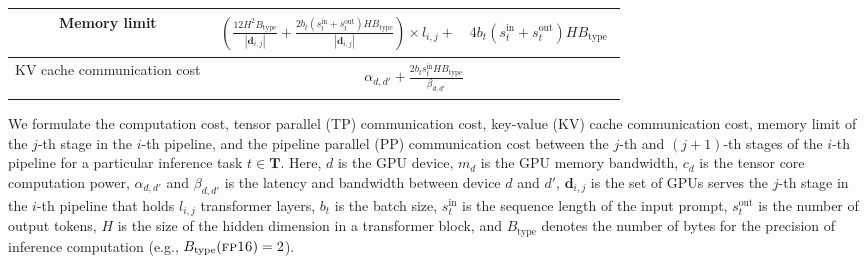 \begin{table*}[t!]
\begin{small}
\begin{center}
{\begin{tabular}{c | c | c}
\hline
Memory limit &
\multicolumn{2}{c}{
$
\begin{aligned}
\left(\frac{12H^2 B_{\text{type}}}{\left|\mathbf{d}_{i,j}\right|} + \frac{2 b_t \left(s^{\text{in}}_t + s^{\text{out}}_t\right) H B_{\text{type}}}{\left|\mathbf{d}_{i,j}\right|} \right) \times l_{i,j} + \quad 4 b_t \left(s^{\text{in}}_t + s^{\text{out}}_t\right) H B_{\text{type}}
\end{aligned}
$ 
} \\
\hline
KV cache communication cost &
\multicolumn{2}{c}{
$
\begin{aligned}
\alpha_{d,d'} + \frac{2 b_t s^{\text{in}}_t H B_{\text{type}}}{\beta_{d,d'}}
\end{aligned}
$
} \\
\hline
\end{tabular}%
}
\end{center}
\end{small}
\scriptsize{We formulate the computation cost, tensor parallel (TP) communication cost, key-value (KV) cache communication cost, memory limit of the $j$-th stage in the $i$-th pipeline, and the pipeline parallel (PP) communication cost between the $j$-th and $(j{+}1)$-th stages of the $i$-th pipeline for a particular inference task $t \in \mathbf{T}$. Here, $d$ is the GPU device, $m_d$ is the GPU memory bandwidth, $c_d$ is the tensor core computation power, $\alpha_{d,d'}$ and $\beta_{d,d'}$ is the latency and bandwidth between device $d$ and $d'$, $\mathbf{d}_{i,j}$ is the set of GPUs serves the $j$-th stage in the $i$-th pipeline that holds $l_{i,j}$ transformer layers, $b_{t}$ is the batch size, $s^{\text{in}}_{t}$ is the sequence length of the input prompt, $s^{\text{out}}_{t}$ is the number of output tokens, $H$ is the size of the hidden dimension in a transformer block, and $B_{\text{type}}$ denotes the number of bytes for the precision of inference computation (e.g., $B_{\text{type}}(\textsc{fp16})=2$).}
\end{table*}
